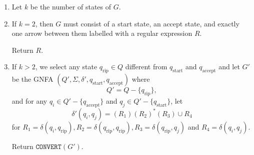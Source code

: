 \begin{enumerate}
    \item Let $k$ be the number of states of $G$.
    
    \item If $k=2$, then $G$ must consist of a start state, an accept state, and exactly one arrow between them labelled with a regular expression $R$.
    
    Return $R.$
    
    \item If $k>2$, we select any state $q_{\text{rip}}\in Q$ different from $q_{\text{start}}$ and $q_{\text{accept}}$ and let $G'$ be the GNFA $(Q',\Sigma,\delta',q_{\text{start}},q_{\text{accept}})$ where
    $$Q'=Q-\{q_{\text{rip}}\},$$
    and for any $q_i\in Q'-\{q_{\text{accept}}\}$ and $q_j\in Q'-\{q_{\text{start}}\}$, let
    $$\delta'(q_i,q_j)=(R_1)(R_2)^*(R_3)\cup R_4$$
    for $R_1=\delta(q_i,q_\text{rip}), R_2=\delta(q_\text{rip}, q_\text{rip}), R_3=\delta(q_\text{rip},q_j)$ and $R_4=\delta(q_i,q_j)$.
    
    Return $\texttt{CONVERT}(G')$.  
\end{enumerate}

